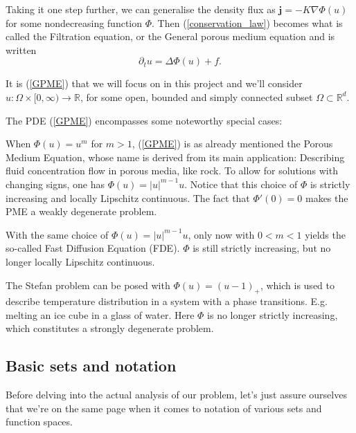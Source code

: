 \documentclass[11pt, a4paper]{article}
\begin{document}
Taking it one step further, we can generalise the density flux as $\textbf{j} = -K\nabla \Phi(u)$ for some nondecreasing function $\Phi$. Then (\ref{conservation_law}) becomes what is called the Filtration equation, or the General porous medium equation and is written
\begin{equation}
\label{GPME}
	\partial_t u = \Delta \Phi(u) + f.
\end{equation}

It is (\ref{GPME}) that we will focus on in this project and we'll consider $u: \Omega \times [0,\infty) \to \mathbb{R}$, for some open, bounded and simply connected subset $\Omega \subset \mathbb{R}^d$.
 
The PDE (\ref{GPME}) encompasses some noteworthy special cases:
\begin{example}[PME]
When $\Phi(u) = u^m$ for $m>1$, (\ref{GPME}) is as already mentioned the Porous Medium Equation, whose name is derived from its main application: Describing fluid concentration flow in porous media, like rock. To allow for solutions with changing signs, one has $\Phi(u) = |u|^{m-1}u$. Notice that this choice of $\Phi$ is strictly increasing and locally Lipschitz continuous. The fact that $\Phi'(0) = 0$ makes the PME a weakly degenerate problem.
\end{example}

\begin{example}[FDE]
With the same choice of $\Phi(u) = |u|^{m-1}u$, only now with $0<m<1$ yields the so-called Fast Diffusion Equation (FDE). $\Phi$ is still strictly increasing, but no longer locally Lipschitz continuous.
\end{example}

\begin{example}
The Stefan problem can be posed with $\Phi(u) = (u-1)_+$, which is used to describe temperature distribution in a system with a phase transitions. E.g. melting an ice cube in a glass of water. Here $\Phi$ is no longer strictly increasing, which constitutes a  strongly degenerate problem.
\end{example}





\subsection{Basic sets and notation}
Before delving into the actual analysis of our problem, let's just assure ourselves that we're on the same page when it comes to notation of various sets and function spaces.
\end{document}
